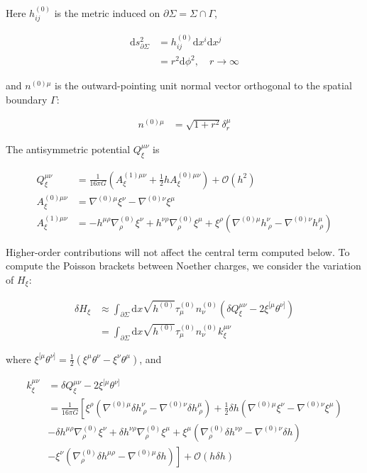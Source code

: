 Here \(h^{(0)}_{ij}\) is the metric induced on \(\partial \Sigma=\Sigma \cap \Gamma\),

\begin{align}
\mathrm{d}s^{2}_{\partial \Sigma} & =h^{(0)}_{ij}\mathrm{d}x^{i}\mathrm{d}x^{j} \\
 & =r^{2}\mathrm{d}\phi ^{2}, \quad r\to \infty
\end{align}

and \(n^{(0)\mu}\) is the outward-pointing unit normal vector orthogonal to the spatial boundary \(\Gamma\):

\begin{align}
n^{(0)\mu} & =\sqrt{ 1+r^{2} }\delta ^{\mu}_{r}
\end{align}

The antisymmetric potential \(Q_{\xi}^{\mu \nu}\) is

\begin{align}
Q_{\xi}^{\mu \nu} & =\frac{1}{16\pi G}\left(A^{(1)\mu \nu}_{\xi}+\frac{1}{2}hA_{\xi}^{(0)\mu \nu}\right)+\mathcal{O}(h^{2}) \\
A_{\xi}^{(0)\mu \nu} & =\nabla ^{(0)\mu}\xi ^{\nu}-\nabla ^{(0)\nu}\xi ^{\mu} \\
A_{\xi}^{(1)\mu \nu} & =-h^{\mu \rho}\nabla ^{(0)}_{\rho}\xi ^{\nu}+h^{\nu \rho}\nabla ^{(0)}_{\rho}\xi ^{\mu}+\xi ^{\rho}(\nabla ^{(0)\mu}h^{\nu}_{~\rho}-\nabla ^{(0)\nu}h^{\mu}_{~\rho})
\end{align}

Higher-order contributions will not affect the central term computed below. To compute the Poisson brackets between Noether charges, we consider the variation of \(H_{\xi}\):

\begin{align}
\delta H_{\xi} & \approx \int _{\partial \Sigma}\mathrm{d}x\sqrt{ h^{(0)} }\tau ^{(0)} _{\mu}n^{(0)}_{\nu}\left(\delta Q_{\xi}^{\mu \nu}-2\xi ^{[\mu}\theta ^{\nu]}\right) \\
 & =\int _{\partial \Sigma}\mathrm{d}x\sqrt{ h^{(0)} }\tau _{\mu}^{(0)}n_{\nu}^{(0)}k _{\xi}^{\mu \nu}
\end{align}

where \(\xi ^{[\mu}\theta ^{\nu]}=\frac{1}{2}(\xi ^{\mu}\theta ^{\nu}-\xi ^{\nu}\theta ^{\mu})\), and

\begin{align}
k _{\xi}^{\mu \nu} & =\delta Q_{\xi}^{\mu \nu}-2\xi ^{[\mu}\theta ^{\nu]} \\
 & =\frac{1}{16\pi G}\left[ \xi ^{\rho}(\nabla ^{(0)\mu}\delta h^{\nu}_{~\rho}-\nabla ^{(0)\nu}\delta h^{\mu}_{~\rho})+\frac{1}{2}\delta h\left(\nabla ^{(0)\mu}\xi ^{\nu}-\nabla ^{(0)\nu}\xi ^{\mu}\right) \right. \\
 & -\delta h^{\mu \rho}\nabla ^{(0)}_{\rho}\xi ^{\nu}+\delta h^{\nu \rho}\nabla ^{(0)}_{\rho}\xi ^{\mu}+\xi ^{\mu}(\nabla ^{(0)}_{\rho}\delta h^{\nu \rho}-\nabla ^{(0)\nu}\delta h) \\
 & \left.-\xi ^{\nu}(\nabla ^{(0)}_{\rho}\delta h^{\mu \rho}-\nabla ^{(0)\mu}\delta h)\right]+\mathcal{O}(h\delta h)
\end{align}

